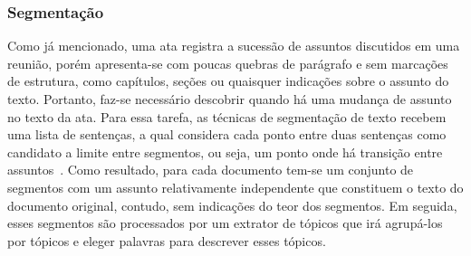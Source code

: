 














\subsubsection{Segmentação}

Como já mencionado, uma ata registra a sucessão de assuntos discutidos em uma reunião, porém apresenta-se com poucas quebras de parágrafo e sem marcações de estrutura, como capítulos, seções ou quaisquer indicações sobre o assunto do texto. Portanto, faz-se necessário descobrir quando há uma mudança de assunto no texto da ata. Para essa tarefa, as técnicas de segmentação de texto recebem uma lista de sentenças, a qual considera cada ponto entre duas sentenças como candidato a limite entre segmentos, ou seja, um ponto onde há transição entre assuntos~\cite{Bokaei2016}. Como resultado, para cada documento tem-se um conjunto de segmentos com um assunto relativamente independente que constituem o texto do documento original, contudo, sem indicações do teor dos segmentos. Em seguida, esses segmentos são processados por um extrator de tópicos que irá agrupá-los por tópicos e eleger palavras para descrever esses tópicos.

